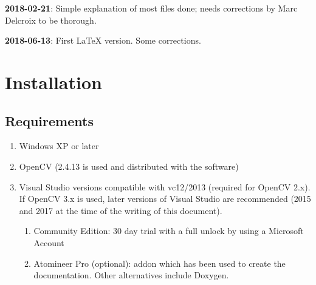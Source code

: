 \documentclass[a4paper,11pt]{memoir}
\begin{document}
\textbf{2018-02-21}: Simple explanation of most files done; needs corrections by Marc Delcroix to be thorough.

\textbf{2018-06-13}: First \LaTeX{} version. Some corrections.

\chapter{Installation}

\section{Requirements}
\begin{enumerate}
\item Windows XP or later
\item  OpenCV (2.4.13 is used and distributed with the software)
\item  Visual Studio versions compatible with vc12/2013 (required for OpenCV 2.x). If OpenCV 3.x is used, later versions of Visual Studio are recommended (2015 and 2017 at the time of the writing of this document).
\begin{enumerate}
\item Community Edition: 30 day trial with a full unlock by using a Microsoft Account
\item Atomineer Pro (optional): addon which has been used to create the
documentation. Other alternatives include Doxygen.
\end{enumerate}
\end{enumerate}
\end{document}

